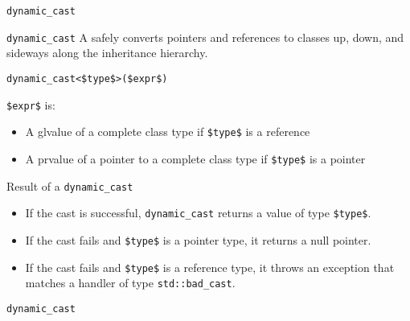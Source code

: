 \begin{frame}{\texttt{dynamic\_cast}}{}
  \begin{block}{\texttt{dynamic\_cast}}
    A  safely converts pointers and references to classes up, down, and sideways along the inheritance hierarchy.

    {
      \hfill\lstinline[mathescape]!dynamic_cast<$type$>($expr$)!\hfill
    }

    \lstinline[mathescape]!$expr$! is:
    \begin{itemize}
    \item
      A glvalue of a complete class type if \lstinline[mathescape]!$type$! is a reference
    \item
      A prvalue of a pointer to a complete class type if \lstinline[mathescape]!$type$! is a pointer
    \end{itemize}
  \end{block}

  \begin{block}{Result of a \texttt{dynamic\_cast}}
    \begin{itemize}
    \item
      If the cast is successful, \lstinline!dynamic_cast! returns a value of type \lstinline[mathescape]!$type$!.
    \item
      If the cast fails and \lstinline[mathescape]!$type$! is a pointer type, it returns a null pointer.
    \item
      If the cast fails and \lstinline[mathescape]!$type$! is a reference type, it throws an exception that matches a handler of type \lstinline!std::bad_cast!.
    \end{itemize}
  \end{block}
\end{frame}

\begin{frame}{\texttt{dynamic\_cast}}{}
  \begin{example}
  \end{example}
\end{frame}

